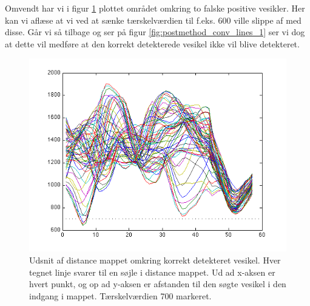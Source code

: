 Omvendt har vi i figur \ref{fig:postmethod_conv_lines_2} plottet området omkring to falske positive vesikler. Her kan vi aflæse at vi ved at sænke tærskelværdien til f.eks. 600 ville slippe af med disse. Går vi så tilbage og ser på figur \ref{fig:postmethod_conv_lines_1} ser vi dog at dette vil medføre at den korrekt detekterede vesikel ikke vil blive detekteret.

\begin{figure}[H]
		\centering
		\includegraphics[scale=0.9]{files/postmethod/img/conv_lines_2.png}
	\caption{Udsnit af distance mappet omkring korrekt detekteret vesikel. Hver tegnet linje svarer til en søjle i distance mappet. Ud ad x-aksen er hvert punkt, og op ad y-aksen er afstanden til den søgte vesikel i den indgang i mappet. Tærskelværdien 700 markeret.\label{fig:postmethod_conv_lines_2}}
\end{figure}

